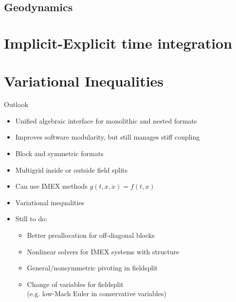 \documentclass{beamer}
\begin{document}
\subsection{Geodynamics}



\section{Implicit-Explicit time integration}


\section{Variational Inequalities}


\begin{frame}{Outlook}
  \begin{itemize}
  \item Unified algebraic interface for monolithic and nested formats
  \item Improves software modularity, but still manages stiff coupling
  \item Block and symmetric formats
  \item Multigrid inside or outside field splits
  \item Can use IMEX methods $g(t,x,\dot x) = f(t,x)$
  \item Variational inequalities
  \item Still to do:
    \begin{itemize}
    \item Better preallocation for off-diagonal blocks
    \item Nonlinear solvers for IMEX systems with structure
    \item General/nonsymmetric pivoting in fieldsplit
    \item Change of variables for fieldsplit \\ (e.g. low-Mach Euler in conservative variables)
    \end{itemize}
  \end{itemize}
\end{frame}
\end{document}
